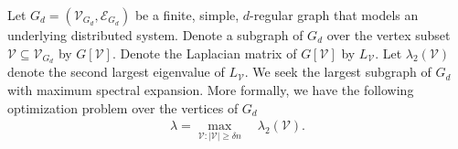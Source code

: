 \documentclass[reqno,8pt]{amsart}
\theoremstyle{definition}
\theoremstyle{remark}
\numberwithin{equation}{section}
\def\cV{\mathcal{V}}
\def\cVGD{\mathcal{V}_{G_d}}
\def\cEGD{\mathcal{E}_{G_d}}
\def\GD{G_d=(\cVGD,\cEGD)}
\begin{document}
Let $\GD$ be a finite, simple, $d$-regular graph that models an underlying distributed system. Denote a subgraph of $G_d$ over the vertex subset $\cV \subseteq \cVGD$ by $G[\cV]$. Denote the Laplacian matrix of $G[\cV]$ by $L_{\cV}$. Let $\lambda_2(\cV)$ denote the second largest eigenvalue of $L_{\cV}$. We seek the largest subgraph of $G_d$ with maximum spectral expansion. More formally, we have the following optimization problem over the vertices of $G_d$
\begin{align}
\displaystyle \lambda = \max_{\cV:|\cV| \geq \delta n} \quad \lambda_2(\cV). \label{eq:specExpansion}
\end{align} 
\end{document}
